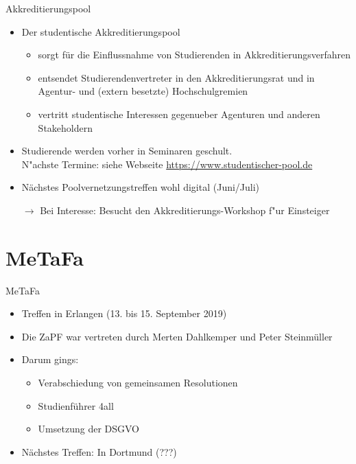 \documentclass[compress, aspectratio=169]{beamer}
\begin{document}
\begin{frame}{Akkreditierungspool}
    \begin{itemize}
        \item Der studentische Akkreditierungspool
        \begin{itemize}
        	\item sorgt für die Einflussnahme von Studierenden in Akkreditierungsverfahren
        	\item entsendet Studierendenvertreter in den Akkreditierungsrat und in Agentur- und (extern besetzte) Hochschulgremien
        	\item vertritt studentische Interessen gegenueber Agenturen und anderen Stakeholdern
        \end{itemize}         
        \item Studierende werden vorher in Seminaren geschult. \\
          {\scriptsize\color{blue} N"achste Termine: siehe Webseite \url{https://www.studentischer-pool.de}}
        \item Nächstes Poolvernetzungstreffen wohl digital {\color{blue} (Juni/Juli)}
        \vspace{0.5cm}
        \item[$\rightarrow$] Bei Interesse: Besucht den Akkreditierungs-Workshop f"ur Einsteiger
    \end{itemize}
\end{frame}


\section{MeTaFa}

 \begin{frame}{MeTaFa}
  \begin{itemize}
    \item Treffen in Erlangen (13. bis 15. September 2019)
    \item Die ZaPF war vertreten durch Merten Dahlkemper und Peter Steinmüller
    \item Darum gings:
    \begin{itemize}
        \item Verabschiedung von gemeinsamen Resolutionen
        \item Studienführer 4all
        \item Umsetzung der DSGVO
    \end{itemize}
    \item Nächstes Treffen: In Dortmund (???)
   \end{itemize}
 \end{frame}
\end{document}
